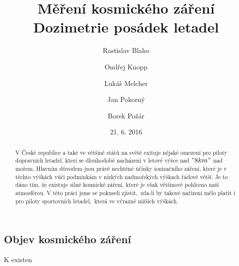 \documentclass[12pt,a4paper]{article}
\begin{document}
\title{Měření kosmického záření\\Dozimetrie posádek letadel}
\author[1]{Rastislav Blaho}
\author[2]{Ondřej Knopp}
\author[3]{Lukáš Melcher}
\author[4]{Jan Pokorný}
\author[5]{Borek Požár}

\date{21. 6. 2016}

\maketitle

\thispagestyle{empty}

\begin{abstract}
V České republice a také ve většině států na světě exituje nějaké omezení pro
piloty dopravních letadel, kterí se dlouhodobě nacházení v letové výšce nad
$"8 km"$ nad mořem. Hlavním důvodem jsou právě nechtěné účinky ionizačního
záření, které je v těchto výškách vůči podmínkám v nízkých nadmořských výškach
řádově větší. Je to dáno tím, že existuje silné kosmické záření, které je však
většinově pohlceno naší atmosférou. V této práci jsme se pokuseli
zjistit,~zda-li by takové nařízení mělo platit i pro piloty sportovních
letadel,~která ve výrazně nižších výškách.
%

\end{abstract}
\subsection*{Objev kosmického záření}
K existen
\end{document}
